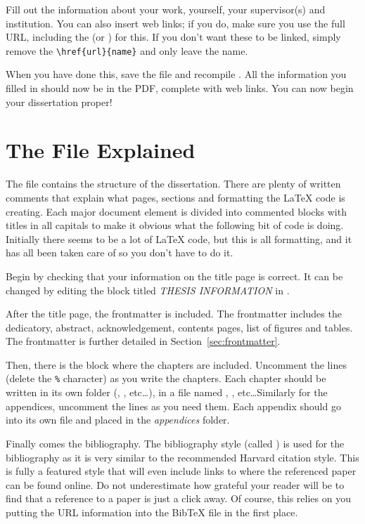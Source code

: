 Fill out the information about your work, yourself, your supervisor(s) and institution. You can also insert web links; if you do, make sure you use the full URL, including the  (or ) for this. If you don't want these to be linked, simply remove the \texttt{\textbackslash href\{url\}\{name\}} and only leave the name.

When you have done this, save the file and recompile . All the information you filled in should now be in the PDF, complete with web links. You can now begin your dissertation proper!


\section{The  File Explained}

The  file contains the structure of the dissertation. There are plenty of written comments that explain what pages, sections and formatting the \LaTeX{} code is creating. Each major document element is divided into commented blocks with titles in all capitals to make it obvious what the following bit of code is doing. Initially there seems to be a lot of \LaTeX{} code, but this is all formatting, and it has all been taken care of so you don't have to do it.

Begin by checking that your information on the title page is correct. It can be changed by editing the block titled \emph{THESIS INFORMATION} in . 

After the title page, the frontmatter is included. The frontmatter includes the dedicatory, abstract, acknowledgement, contents pages, list of figures and tables. The frontmatter is further detailed in Section~\ref{sec:frontmatter}.

Then, there is the block where the chapters are included. Uncomment the lines (delete the \texttt{\%} character) as you write the chapters. Each chapter should be written in its own folder (, , etc\ldots), in a file named , , etc\ldots Similarly for the appendices, uncomment the lines as you need them. Each appendix should go into its own file and placed in the \emph{appendices} folder.

Finally comes the bibliography. The bibliography style (called ) is used for the bibliography as it is very similar to the recommended Harvard citation style. This is fully a featured style that will even include links to where the referenced paper can be found online. Do not underestimate how grateful your reader will be to find that a reference to a paper is just a click away. Of course, this relies on you putting the URL information into the BibTeX file in the first place.


